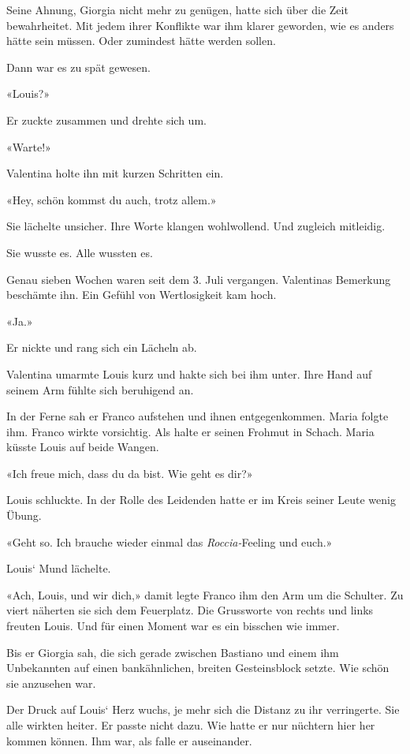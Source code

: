 Seine Ahnung, Giorgia nicht mehr zu genügen, hatte sich über die Zeit
bewahrheitet. Mit jedem ihrer Konflikte war ihm klarer geworden, wie es
anders hätte sein müssen. Oder zumindest hätte werden sollen.

Dann war es zu spät gewesen.

«Louis?»

Er zuckte zusammen und drehte sich um.

«Warte!»

Valentina holte ihn mit kurzen Schritten ein.

«Hey, schön kommst du auch, trotz allem.»

Sie lächelte unsicher. Ihre Worte klangen wohlwollend. Und zugleich
mitleidig.

Sie wusste es. Alle wussten es.

Genau sieben Wochen waren seit dem 3. Juli vergangen. Valentinas
Bemerkung beschämte ihn. Ein Gefühl von Wertlosigkeit kam hoch.

«Ja.»

Er nickte und rang sich ein Lächeln ab.

Valentina umarmte Louis kurz und hakte sich bei ihm unter. Ihre Hand auf
seinem Arm fühlte sich beruhigend an.

In der Ferne sah er Franco aufstehen und ihnen entgegenkommen. Maria
folgte ihm. Franco wirkte vorsichtig. Als halte er seinen Frohmut in
Schach. Maria küsste Louis auf beide Wangen.

«Ich freue mich, dass du da bist. Wie geht es dir?»

Louis schluckte. In der Rolle des Leidenden hatte er im Kreis seiner
Leute wenig Übung.

«Geht so. Ich brauche wieder einmal das \emph{Roccia-}Feeling und euch.»

Louis` Mund lächelte.

«Ach, Louis, und wir dich,» damit legte Franco ihm den Arm um die
Schulter. Zu viert näherten sie sich dem Feuerplatz. Die Grussworte von
rechts und links freuten Louis. Und für einen Moment war es ein bisschen
wie immer.

Bis er Giorgia sah, die sich gerade zwischen Bastiano und einem ihm
Unbekannten auf einen bankähnlichen, breiten Gesteinsblock setzte. Wie
schön sie anzusehen war.

Der Druck auf Louis` Herz wuchs, je mehr sich die Distanz zu ihr
verringerte. Sie alle wirkten heiter. Er passte nicht dazu. Wie hatte er
nur nüchtern hier her kommen können. Ihm war, als falle er auseinander.

